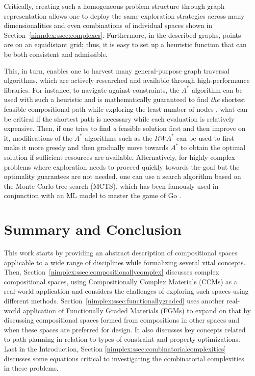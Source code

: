 Critically, creating such a homogeneous problem structure through graph representation allows one to deploy the same exploration strategies across many dimensionalities and even combinations of individual spaces shown in Section~\ref{nimplex:ssec:complexes}. Furthermore, in the described graphs, points are on an equidistant grid; thus, it is easy to set up a heuristic function that can be both consistent and admissible. 

This, in turn, enables one to harvest many general-purpose graph traversal algorithms, which are actively researched and available through high-performance libraries. For instance, to navigate against constraints, the $A^*$ algorithm \cite{Hart1968APaths} can be used with such a heuristic and is mathematically guaranteed to find \textit{the} shortest feasible compositional path while exploring the least number of nodes \cite{Dechter1985GeneralizedA}, what can be critical if the shortest path is necessary while each evaluation is relatively expensive. Then, if one tries to find \emph{a} feasible solution first and then improve on it, modifications of the $A^*$ algorithms such as the $RWA^*$ \cite{Bhatia2021OnA} can be used to first make it more greedy and then gradually move towards $A^*$ to obtain the optimal solution if sufficient resources are available. Alternatively, for highly complex problems where exploration needs to proceed quickly towards the goal but the optimality guarantees are not needed, one can use a search algorithm based on the Monte Carlo tree search (MCTS), which has been famously used in conjunction with an ML model to master the game of Go \cite{Silver2016MasteringSearch}.



\section{Summary and Conclusion} \label{nimplex:sec:summary}

This work starts by providing an abstract description of compositional spaces applicable to a wide range of disciplines while formalizing several vital concepts. Then, Section~\ref{nimplex:ssec:compositionallycomplex} discusses complex compositional spaces, using Compositionally Complex Materials (CCMs) as a real-world application and considers the challenges of exploring such spaces using different methods. Section~\ref{nimplex:ssec:functionallygraded} uses another real-world application of Functionally Graded Materials (FGMs) to expand on that by discussing compositional spaces formed from compositions in other spaces and when these spaces are preferred for design. It also discusses key concepts related to path planning in relation to types of constraint and property optimizations. Last in the Introduction, Section \ref{nimplex:ssec:combinatorialcomplexities} discusses some equations critical to investigating the combinatorial complexities in these problems.

